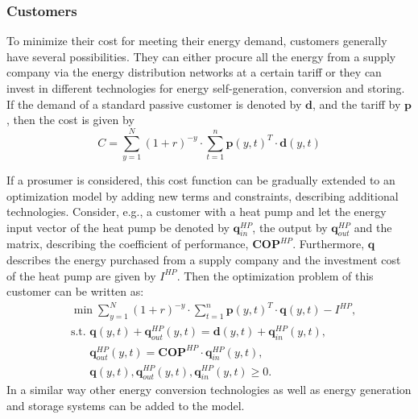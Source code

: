 \documentclass[review]{elsarticle}
\begin{document}
\subsubsection{Customers}
To minimize their cost for meeting their energy demand, customers
generally have several possibilities. They can either procure all the
energy from a supply company via the energy distribution networks at a
certain tariff or they can invest in different technologies for energy
self-generation, conversion and storing.
If the demand of a standard passive customer is
denoted by $\mathbf{d}$, and the tariff by $\mathbf{p}$, then the cost is given by 
\begin{equation*}
  C = \sum_{y=1}^{N}(1+r)^{-y} \cdot \sum_{t=1}^{n} \mathbf{p}(y,t)^{T} \cdot \mathbf{d}(y,t)
\end{equation*}

If a prosumer is considered, this cost function can be gradually
extended to an optimization model by adding new terms and constraints,
describing additional technologies. Consider, e.g., a customer with a
heat pump and let the energy input vector of the heat pump be denoted
by $\mathbf{q}_{in}^{HP}$, the output by $\mathbf{q}_{out}^{HP}$ and the matrix,
describing the coefficient of performance, $\mathbf{COP}^{HP}$. Furthermore,
$\mathbf{q}$ describes the energy purchased from a supply company and the
investment cost of the heat pump are given by $I^{HP}$. Then the
optimization problem of this customer can be written as: 
\begin{align*}
  & \min \sum_{y=1}^{N}(1+r)^{-y} \cdot \sum_{t=1}^{n} \mathbf{p}(y,t)^T \cdot
  \mathbf{q}(y,t) - I^{HP}, \\
  & \textrm{s.t. } \mathbf{q}(y,t) + \mathbf{q}_{out}^{HP} (y,t)  = \mathbf{d}(y,t) +
                     \mathbf{q}_{in}^{HP} (y,t), \\
  & \phantom{\textrm{s.t. }}\mathbf{q}_{out}^{HP}(y,t) = \mathbf{COP}^{HP} \cdot \mathbf{q}_{in}^{HP} (y,t), \\
  & \phantom{\textrm{s.t. }}\mathbf{q}(y,t), \mathbf{q}_{out}^{HP}(y,t), \mathbf{q}_{in}^{HP}(y,t) \geq 0.
\end{align*} %
In a similar way other energy conversion technologies as well as
energy generation and storage systems can be added to the model. 
\end{document}

